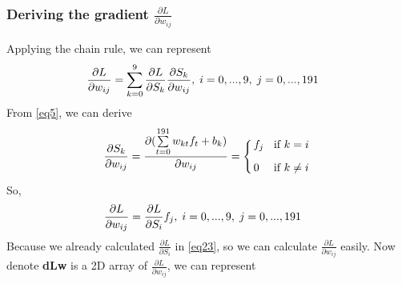 \documentclass[a4paper,12pt]{article}
\newcommand*\myyellowbox[1]{%
\colorbox{myyellow}{\hspace{1em}#1\hspace{1em}}}
\begin{document}
\subsubsection{Deriving the gradient $\frac{\partial{L}}{\partial{w_{ij}}}$}
Applying the chain rule, we can represent
\begin{equation}
\begin{aligned}
\frac{\partial{L}}{\partial{w_{ij}}} &= \sum_{k=0}^9\frac{\partial{L}}{\partial{S_k}}\frac{\partial{S_k}}{\partial{w_{ij}}},\thickspace i = 0, ..., 9, \thickspace j = 0, ..., 191 \label{eq27}
\end{aligned}
\end{equation}
From \eqref{eq5}, we can derive
\begin{equation}
\arraycolsep=0.05cm\def\arraystretch{1.0}
\begin{aligned}
\frac{\partial{S_k}}{\partial{w_{ij}}} = \frac{\partial{(\sum\limits_{t=0}^{191}w_{kt}f_{t} + b_{k})}}{\partial{w_{ij}}} = \left\{
                                        \begin{array}{ll}
                                          f_j &\thickspace\text{ if } k = i\\[0.3cm]
                                          0 &\thickspace\text{ if } k \neq i
                                        \end{array}
                                     \right. \label{eq28}
\end{aligned}
\end{equation}
So,
\begin{equation}
\begin{aligned}
\frac{\partial{L}}{\partial{w_{ij}}} &= \frac{\partial{L}}{\partial{S_i}}f_j,\thickspace i = 0, ..., 9, \thickspace j = 0, ..., 191 \label{eq29}
\end{aligned}
\end{equation}
Because we already calculated $\frac{\partial{L}}{\partial{S_i}}$ in \eqref{eq23}, so we can calculate $\frac{\partial{L}}{\partial{w_{ij}}}$ easily. Now denote \textbf{dLw} is a 2D array of $\frac{\partial{L}}{\partial{w_{ij}}}$, we can represent
\end{document}
